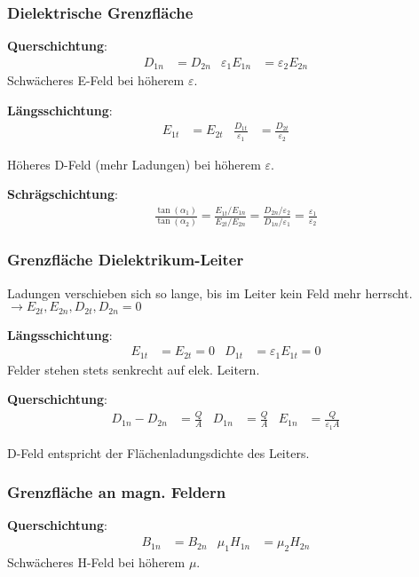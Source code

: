 \subsubsection{Dielektrische Grenzfläche}
\textbf{Querschichtung}:
\begin{align*}
	D_{1n} & = D_{2n} & \varepsilon_1 E_{1n} & =\varepsilon_2 E_{2n} &
\end{align*}
Schwächeres E-Feld bei höherem $ \varepsilon $.

\vspace{0.5em}
\textbf{Längsschichtung}:
\begin{align*}
	E_{1t} & = E_{2t} & \frac{D_{1t}}{\varepsilon_1} & = \frac{D_{2t}}{\varepsilon_2} &
\end{align*}

Höheres D-Feld (mehr Ladungen) bei höherem $ \varepsilon $.

\vspace{0.5em}
\textbf{Schrägschichtung}:
\begin{align*}
	 & \frac{\tan( \alpha_1)}{\tan( \alpha_2)} = \frac{E_{1t}/E_{1n}}{E_{2t}/E_{2n}} = \frac{D_{2n}/\varepsilon_2}{D_{1n}/\varepsilon_1} = \frac{ \varepsilon_1}{\varepsilon_2}
\end{align*}

\subsubsection{Grenzfläche Dielektrikum-Leiter}
Ladungen verschieben sich so lange, bis im Leiter kein Feld mehr herrscht.
$\rightarrow E_{2t}, E_{2n}, D_{2t}, D_{2n} = 0 $

\vspace{0.5em}
\textbf{Längsschichtung}:
\begin{align*}
	E_{1t} & = E_{2t} = 0 & D_{1t} & =\varepsilon_1 E_{1t} = 0 &
\end{align*}
Felder stehen stets senkrecht auf elek. Leitern.

\vspace{0.5em}
\textbf{Querschichtung}:
\begin{align*}
	D_{1n} - D_{2n} & = \frac{Q}{A} & D_{1n} & = \frac{Q}{A} & E_{1n} & = \frac{Q}{\varepsilon_1 A} &
\end{align*}

D-Feld entspricht der Flächenladungsdichte des Leiters.

\subsubsection{Grenzfläche an magn. Feldern}
\textbf{Querschichtung}:
\begin{align*}
	B_{1n} & = B_{2n} & \mu_1 H_{1n} & =\mu_2 H_{2n} &
\end{align*}
Schwächeres H-Feld bei höherem $ \mu $.\\

